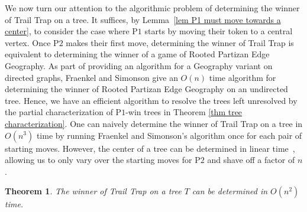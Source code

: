 \documentclass{article}
\theoremstyle{plain}
\newtheorem{theorem}{Theorem}
\theoremstyle{definition}
\def\pone{{\rm{P}\ensuremath{1}}}
\def\ptwo{{\rm{P}\ensuremath{2}}}
\begin{document}
We now turn our attention to the algorithmic problem of determining the winner of {\sc Trail Trap} on a tree. It suffices, by 
Lemma~\ref{lem P1 must move towards a center}, to consider the case where \pone{} starts by moving their token to 
a central vertex. 
Once \ptwo{} makes their first move, determining the winner of {\sc Trail Trap} is equivalent to determining the winner of a game of {\sc Rooted Partizan Edge Geography}. As part of providing an algorithm for a Geography variant on directed graphs, Fraenkel and Simonson \cite{FS93} give an $O(n)$ time algorithm for determining the winner of {\sc Rooted Partizan Edge Geography} on an undirected tree. Hence, we have an efficient algorithm to resolve the trees left unresolved by the partial characterization of \pone{}-win trees in Theorem \ref{thm tree characterization}.
One can naively determine the winner of {\sc Trail Trap} on a tree in $O(n^3)$ time by running Fraenkel and Simonson's algorithm once for each pair of starting moves. 
However, the center of a tree can be determined in linear time~{\cite{CHH1981}}, allowing us to only vary over the starting moves for \ptwo{} and shave off a factor of $n$.
        \begin{theorem}\label{thm algorithm for trees}
            The winner of {\sc Trail Trap} on a tree $T$ can be determined in $O(n^2)$ time. 
        \end{theorem}
\end{document}
